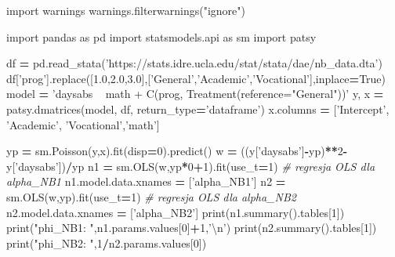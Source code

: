 \documentclass[polish,]{book}
\newenvironment{Shaded}{\begin{snugshade}}{\end{snugshade}}
\newcommand{\BuiltInTok}[1]{#1}
\newcommand{\CharTok}[1]{\textcolor[rgb]{0.31,0.60,0.02}{#1}}
\newcommand{\CommentTok}[1]{\textcolor[rgb]{0.56,0.35,0.01}{\textit{#1}}}
\newcommand{\DecValTok}[1]{\textcolor[rgb]{0.00,0.00,0.81}{#1}}
\newcommand{\FloatTok}[1]{\textcolor[rgb]{0.00,0.00,0.81}{#1}}
\newcommand{\ImportTok}[1]{#1}
\newcommand{\NormalTok}[1]{#1}
\newcommand{\OperatorTok}[1]{\textcolor[rgb]{0.81,0.36,0.00}{\textbf{#1}}}
\newcommand{\StringTok}[1]{\textcolor[rgb]{0.31,0.60,0.02}{#1}}
\newcommand{\VariableTok}[1]{\textcolor[rgb]{0.00,0.00,0.00}{#1}}
\begin{document}
\begin{Shaded}
\begin{Highlighting}[]
\ImportTok{import}\NormalTok{ warnings}
\NormalTok{warnings.filterwarnings(}\StringTok{"ignore"}\NormalTok{)}

\ImportTok{import}\NormalTok{ pandas }\ImportTok{as}\NormalTok{ pd}
\ImportTok{import}\NormalTok{ statsmodels.api }\ImportTok{as}\NormalTok{ sm}
\ImportTok{import}\NormalTok{ patsy}
  
\NormalTok{df }\OperatorTok{=}\NormalTok{ pd.read_stata(}\StringTok{'https://stats.idre.ucla.edu/stat/stata/dae/nb_data.dta'}\NormalTok{)}
\NormalTok{df[}\StringTok{'prog'}\NormalTok{].replace([}\FloatTok{1.0}\NormalTok{,}\FloatTok{2.0}\NormalTok{,}\FloatTok{3.0}\NormalTok{],[}\StringTok{'General'}\NormalTok{,}\StringTok{'Academic'}\NormalTok{,}\StringTok{'Vocational'}\NormalTok{],inplace}\OperatorTok{=}\VariableTok{True}\NormalTok{)}
\NormalTok{model }\OperatorTok{=} \StringTok{'daysabs ~ math + C(prog, Treatment(reference="General"))'}
\NormalTok{y, x }\OperatorTok{=}\NormalTok{ patsy.dmatrices(model, df, return_type}\OperatorTok{=}\StringTok{'dataframe'}\NormalTok{)}
\NormalTok{x.columns }\OperatorTok{=}\NormalTok{ [}\StringTok{'Intercept'}\NormalTok{, }\StringTok{'Academic'}\NormalTok{, }\StringTok{'Vocational'}\NormalTok{,}\StringTok{'math'}\NormalTok{]}
      
\NormalTok{yp }\OperatorTok{=}\NormalTok{ sm.Poisson(y,x).fit(disp}\OperatorTok{=}\DecValTok{0}\NormalTok{).predict()}
\NormalTok{w }\OperatorTok{=}\NormalTok{ ((y[}\StringTok{'daysabs'}\NormalTok{]}\OperatorTok{-}\NormalTok{yp)}\OperatorTok{**}\DecValTok{2}\OperatorTok{-}\NormalTok{y[}\StringTok{'daysabs'}\NormalTok{])}\OperatorTok{/}\NormalTok{yp}
\NormalTok{n1 }\OperatorTok{=}\NormalTok{ sm.OLS(w,yp}\OperatorTok{*}\DecValTok{0}\OperatorTok{+}\DecValTok{1}\NormalTok{).fit(use_t}\OperatorTok{=}\DecValTok{1}\NormalTok{) }\CommentTok{# regresja OLS dla alpha_NB1}
\NormalTok{n1.model.data.xnames }\OperatorTok{=}\NormalTok{ [}\StringTok{'alpha_NB1'}\NormalTok{]}
\NormalTok{n2 }\OperatorTok{=}\NormalTok{ sm.OLS(w,yp).fit(use_t}\OperatorTok{=}\DecValTok{1}\NormalTok{)     }\CommentTok{# regresja OLS dla alpha_NB2}
\NormalTok{n2.model.data.xnames }\OperatorTok{=}\NormalTok{ [}\StringTok{'alpha_NB2'}\NormalTok{]}
\BuiltInTok{print}\NormalTok{(n1.summary().tables[}\DecValTok{1}\NormalTok{])}
\BuiltInTok{print}\NormalTok{(}\StringTok{"phi_NB1: "}\NormalTok{,n1.params.values[}\DecValTok{0}\NormalTok{]}\OperatorTok{+}\DecValTok{1}\NormalTok{,}\StringTok{'}\CharTok{\textbackslash{}n}\StringTok{'}\NormalTok{)}
\BuiltInTok{print}\NormalTok{(n2.summary().tables[}\DecValTok{1}\NormalTok{])}
\BuiltInTok{print}\NormalTok{(}\StringTok{"phi_NB2: "}\NormalTok{,}\DecValTok{1}\OperatorTok{/}\NormalTok{n2.params.values[}\DecValTok{0}\NormalTok{])}
\end{Highlighting}
\end{Shaded}
\end{document}
